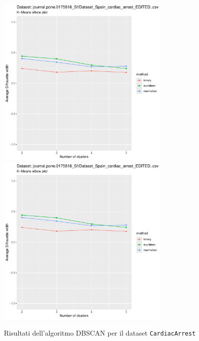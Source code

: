 \documentclass[a4paper, 12pt]{report}
\begin{document}
			\begin{figure}[H]
				\centering
				\includegraphics[width = 0.75\textwidth, height = 0.45\textheight, page = 5]{
					results/results_CardiacArrest.csv.pdf
				}
				\includegraphics[width = 0.75\textwidth, height = 0.45\textheight, page = 6]{
					results/results_CardiacArrest.csv.pdf
				}
				\caption{Risultati dell'algoritmo DBSCAN per il dataset
				\texttt{CardiacArrest}}
				\label{fig:dbscan2}
			\end{figure}
\end{document}
